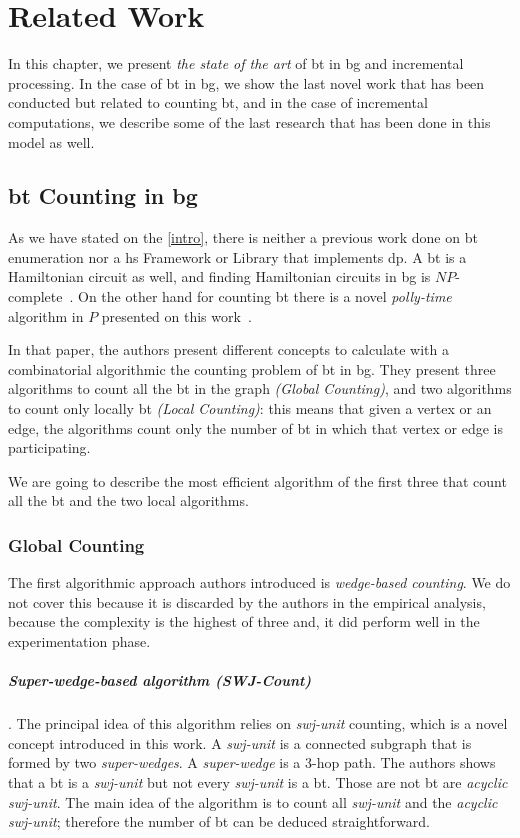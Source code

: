 \chapter{Related Work}\label{relate-work}
In this chapter, we present \emph{the state of the art} of \acrlong{bt} in \acrlong{bg} and incremental processing.
In the case of \acrshort{bt} in \acrshort{bg}, we show the last novel work that has been conducted but related to counting \acrshort{bt},
and in the case of incremental computations, we describe some of the last research that has been done in this model as well. 

\section{\acrlong{bt} Counting in \acrlong{bg}}
As we have stated on the \autoref{intro}, there is neither a previous work done on \acrshort{bt} enumeration nor a \acrshort{hs} Framework or Library that implements \acrshort{dp}.
A \acrshort{bt} is a Hamiltonian circuit as well, and finding Hamiltonian circuits in \acrshort{bg} is $NP$-complete~\cite{hamilbipartite-np}. On the other hand for counting \acrshort{bt} there is a novel \emph{polly-time} algorithm 
 in $P$ presented on this work~\cite{btcount}.

In that paper, the authors present different concepts to calculate with a combinatorial algorithmic the counting problem of \acrshort{bt} in \acrshort{bg}. They present three algorithms to count
all the \acrshort{bt} in the graph \emph{(Global Counting)}, and two algorithms to count only locally \acrshort{bt} \emph{(Local Counting)}: this means that given a vertex or an edge, the algorithms count only the number of \acrshort{bt} in which 
that vertex or edge is participating.

We are going to describe the most efficient algorithm of the first three that count all the \acrshort{bt} and the two local algorithms.

\subsection{Global Counting}
The first algorithmic approach authors introduced is \emph{wedge-based counting}. We do not cover this because it is discarded
by the authors in the empirical analysis, because the complexity is the highest of three and, it did perform well in the experimentation phase.

\paragraph{Super-wedge-based algorithm (SWJ-Count)}.
The principal idea of this algorithm relies on \emph{swj-unit} counting, which is a novel 
concept introduced in this work. A \emph{swj-unit} is a connected subgraph that is formed by two \emph{super-wedges}. A \emph{super-wedge}
is a 3-hop path. The authors shows that a \acrshort{bt} is a \emph{swj-unit} but not every \emph{swj-unit} is a \acrshort{bt}. Those 
are not \acrshort{bt} are \emph{acyclic swj-unit}. The main idea of the algorithm is to count all \emph{swj-unit} and the \emph{acyclic swj-unit}; therefore
the number of \acrshort{bt} can be deduced straightforward.

